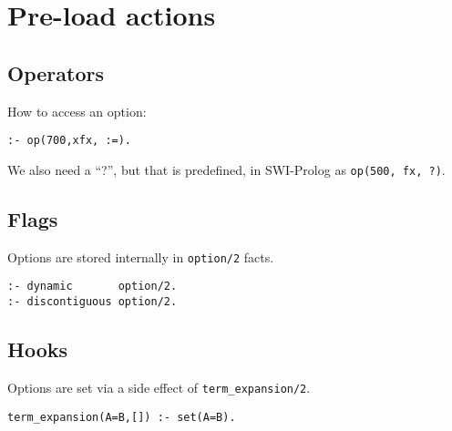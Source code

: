 \section{ Pre-load actions  
}
\subsection{ Operators
}
How to access an  option:
\begin{Verbatim}
:- op(700,xfx, :=).
\end{Verbatim}

We also need a ``?'', but that is predefined,
in SWI-Prolog as {\tt op(500, fx, ?)}.

\subsection{ Flags
}
Options are stored internally in {\tt option/2}
facts.
\begin{Verbatim}
:- dynamic       option/2.
:- discontiguous option/2.
\end{Verbatim}
\subsection{ Hooks
}
Options are set via a side effect of
{\tt term_expansion/2}.
\begin{Verbatim}
term_expansion(A=B,[]) :- set(A=B).
\end{Verbatim}
